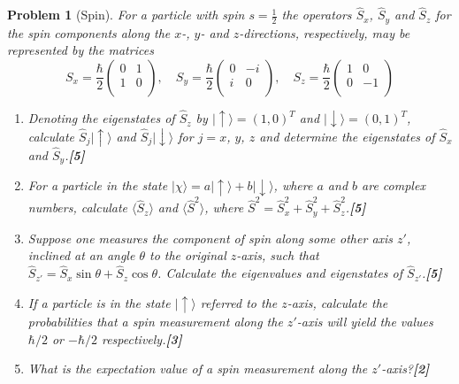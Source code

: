 \documentclass[a4paper]{article}
\theoremstyle{new}
\newtheorem{qns}{Problem}[subsection]
\begin{document}
\begin{qns}[Spin]
For a particle with spin $s=\frac{1}{2}$ the operators $\hat{S}_x$, $\hat{S}_y$ and $\hat{S}_z$ for the spin components along the $x$-, $y$- and $z$-directions, respectively, may be represented by the matrices
$$S_x=\frac{\hbar}{2}\begin{pmatrix}0&1\\1&0\\\end{pmatrix},\quad S_y=\frac{\hbar}{2}\begin{pmatrix}0&-i\\i&0\\\end{pmatrix},\quad S_z=\frac{\hbar}{2}\begin{pmatrix}1&0\\0&-1\\\end{pmatrix}$$
\begin{enumerate}[label=(\roman*)]
\item Denoting the eigenstates of $\hat{S}_z$ by $|\uparrow\rangle=(1,0)^T$ and $|\downarrow\rangle=(0,1)^T$, calculate $\hat{S}_j|\uparrow\rangle$ and $\hat{S}_j|\downarrow\rangle$ for $j = x$, $y$, $z$ and determine the eigenstates of $\hat{S}_x$ and $\hat{S}_y$.\hfill\textbf{[5]}
\item For a particle in the state $|\chi\rangle=a|\uparrow\rangle+b|\downarrow\rangle$, where $a$ and $b$ are complex numbers, calculate $\langle\hat{S}_z\rangle$  and $\langle\hat{S}^2\rangle$, where $\hat{S}^2=\hat{S}_x^2+\hat{S}_y^2+\hat{S}_z^2$.\hfill\textbf{[5]}
\item Suppose one measures the component of spin along some other axis $z'$, inclined at an angle $\theta$ to the original $z$-axis, such that $\hat{S}_{z'}=\hat{S}_x\sin\theta+\hat{S}_z\cos\theta$. Calculate the eigenvalues and eigenstates of $\hat{S}_{z'}$.\hfill\textbf{[5]}
\item If a particle is in the state $|\uparrow\rangle$ referred to the $z$-axis, calculate the probabilities that a spin measurement along the $z'$-axis will yield the values $\hbar/2$ or $-\hbar/2$ respectively.\hfill\textbf{[3]}
\item What is the expectation value of a spin measurement along the $z'$-axis?\hfill\textbf{[2]}
\end{enumerate}
\end{qns}
\end{document}
